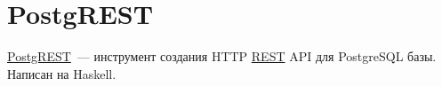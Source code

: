 \section{PostgREST}

\href{http://postgrest.com/}{PostgREST}~--- инструмент создания HTTP \href{https://ru.wikipedia.org/wiki/REST}{REST} API для PostgreSQL базы. Написан на Haskell.
